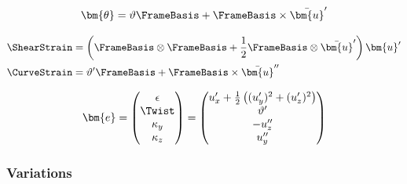 
\begin{equation}
\bm{\theta} = \vartheta \FrameBasis  + \FrameBasis \times \bar{\bm{u}}^{\prime}
\end{equation}


\begin{equation*}
\begin{aligned}
\ShearStrain &= \left(\FrameBasis \otimes\FrameBasis  + \frac{1}{2}\FrameBasis \otimes\bar{\bm{u}}^{\prime}\right)\bm{u}^{\prime} \\
\CurveStrain &= \vartheta^{\prime} \FrameBasis  
 + \FrameBasis \times\bar{\bm{u}}^{\prime\prime}
\end{aligned}
\end{equation*}


\begin{equation}
\bm{e}
= \begin{pmatrix}
    \epsilon \\
    \Twist \\
    \kappa_y  \\
    \kappa_z \\
  \end{pmatrix}
= \begin{pmatrix}
u_x^{\prime} + \frac{1}{2}\left((u_y^{\prime})^2 + (u_z^{\prime})^2\right) \\ 
\vartheta^{\prime} \\
-u_z^{\prime\prime} \\
u_y^{\prime\prime} \\
\end{pmatrix}
\end{equation}

\subsubsection{Variations}


